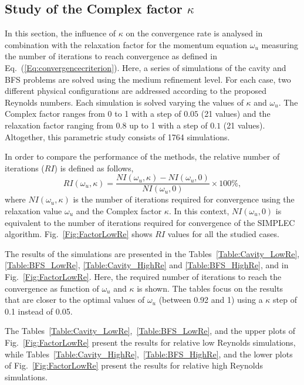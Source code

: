 \documentclass[final,3p,times,11pt,onecolumn]{myElsarticle}
\numberwithin{equation}{section}
\begin{document}
\subsection{Study of the Complex factor $\kappa$}
In this section, the influence of $\kappa$ on the convergence rate is analysed in combination with the relaxation factor for the momentum equation $\omega_{u}$ measuring the number of iterations to reach convergence as defined in Eq.~(\ref{Eq:convergencecriterion}). Here, a series of simulations of the cavity and BFS problems are solved using the medium refinement level. For each case, two different physical configurations are addressed according to the proposed Reynolds numbers. Each simulation is solved varying the values of $\kappa$ and $\omega_{u}$. The Complex factor ranges from 0 to 1 with a step of $0.05$ (21 values) and the relaxation factor ranging from 0.8 up to 1 with a step of $0.1$ (21 values). Altogether, this parametric study consists of 1764 simulations.

In order to compare the performance of the methods, the relative number of iterations ($RI$) is defined as follows, 
\begin{equation}
\label{Eq:relativeIndex}
RI(\omega_u, \kappa)
=
\dfrac
{
NI(\omega_u, \kappa) - NI(\omega_u, 0)
}
{
NI(\omega_u, 0)
}
\times
100 \%,
\end{equation}
where $NI(\omega_u, \kappa)$ is the number of iterations required for convergence using the relaxation value $\omega_u$ and the Complex factor $\kappa$. In this context, $NI(\omega_u, 0)$ is equivalent to the number of iterations required for convergence of the SIMPLEC algorithm. Fig.~\ref{Fig:FactorLowRe} shows $RI$ values for all the studied cases.

The results of the simulations are presented in the Tables~\ref{Table:Cavity_LowRe}, \ref{Table:BFS_LowRe}, \ref{Table:Cavity_HighRe} and \ref{Table:BFS_HighRe}, and in Fig.~\ref{Fig:FactorLowRe}. Here, the required number of iterations to reach the convergence as function of $\omega_u$ and $\kappa$ is shown. The tables focus on the results that are closer to the optimal values of $\omega_u$ (between 0.92 and 1) using a $\kappa$ step of 0.1 instead of 0.05. 
 
The Tables~\ref{Table:Cavity_LowRe},~\ref{Table:BFS_LowRe}, and the upper plots of Fig.~\ref{Fig:FactorLowRe} present the results for relative low Reynolds simulations, while Tables~\ref{Table:Cavity_HighRe},~\ref{Table:BFS_HighRe}, and the lower plots of Fig.~\ref{Fig:FactorLowRe} present the results for relative high Reynolds simulations. 
\end{document}
